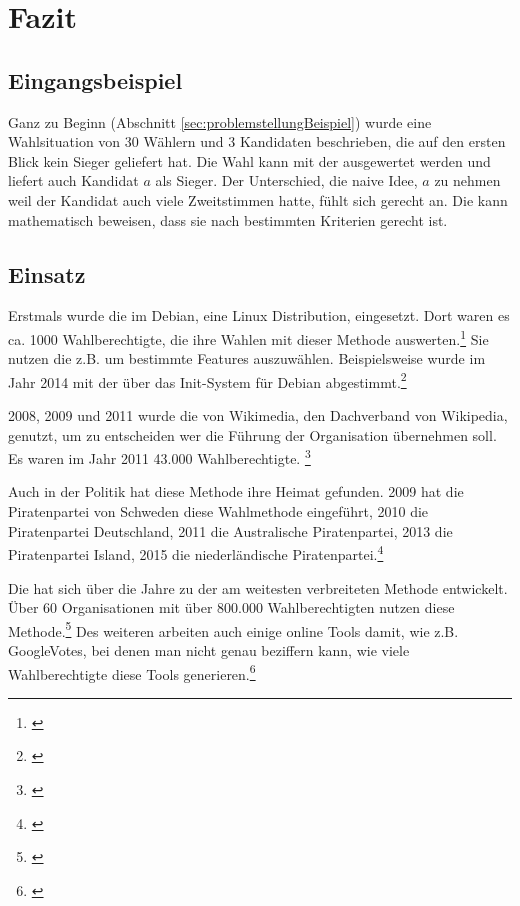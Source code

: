 \newpage
\section{Fazit}
\label{sec:Fazit}

\subsection{Eingangsbeispiel}
Ganz zu Beginn (Abschnitt \ref{sec:problemstellungBeispiel}) wurde eine Wahlsituation von 30 Wählern und 3 Kandidaten beschrieben, die auf den ersten Blick kein Sieger geliefert hat. Die Wahl kann mit der \schulze ausgewertet werden und liefert auch Kandidat $a$ als Sieger. Der Unterschied, die naive Idee, $a$ zu nehmen weil der Kandidat auch viele Zweitstimmen hatte, fühlt sich gerecht an. Die \schulze kann mathematisch beweisen, dass sie nach bestimmten Kriterien gerecht ist.

\subsection{Einsatz} 
\label{sec:einsatz}
Erstmals wurde die  im Debian, eine Linux Distribution, eingesetzt. Dort waren es ca. 1000 Wahlberechtigte, die ihre Wahlen mit dieser Methode auswerten.\footnote{\Vgl \citet{Debian2018}} Sie nutzen die \schulze z.B. um bestimmte Features auszuwählen. Beispielsweise wurde im Jahr 2014 mit der \schulze über das Init-System für Debian abgestimmt.\footnote{\Vgl \citet{Leemhu2014}}



2008, 2009 und 2011 wurde die \schulze von Wikimedia, den Dachverband von Wikipedia, genutzt, um zu entscheiden wer die Führung der Organisation übernehmen soll. Es waren im Jahr 2011 43.000 Wahlberechtigte. \footnote{\Vgl \citet{Schulze2017}}

Auch in der Politik hat diese Methode ihre Heimat gefunden. 2009 hat die Piratenpartei von Schweden diese Wahlmethode eingeführt, 2010 die Piratenpartei Deutschland, 2011 die Australische Piratenpartei, 2013 die Piratenpartei Island, 2015 die niederländische Piratenpartei.\footnote{\Vgl \citet{Lohmann2013}}

Die \schulze hat sich über die Jahre zu der am weitesten verbreiteten \condorcet Methode entwickelt. Über 60 Organisationen mit über 800.000 Wahlberechtigten nutzen diese Methode.\footnote{\Vgl \citet{Schulze2018}} Des weiteren arbeiten auch einige online Tools damit, wie z.B. GoogleVotes, bei denen man nicht genau beziffern kann, wie viele Wahlberechtigte diese Tools generieren.\footnote{\Vgl \citet{Hardt2015}}







